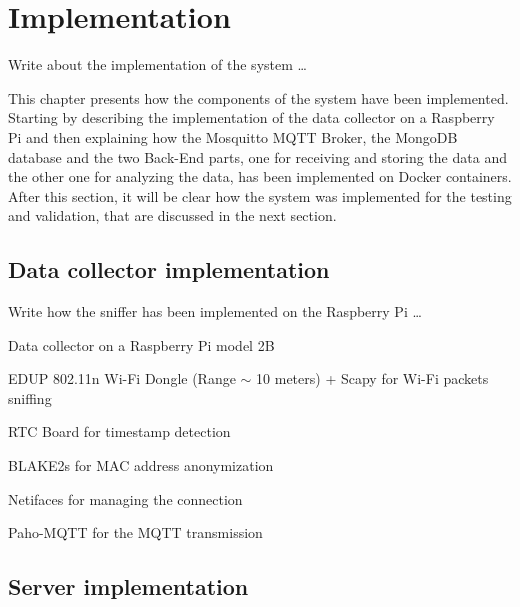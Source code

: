 \chapter{Implementation}
\label{cha:implementation}
\vspace{0.4 cm} 

Write about the implementation of the system \dots

This chapter presents how the components of the system have been implemented.
Starting by describing the implementation of the data collector on a Raspberry Pi and then explaining how the Mosquitto MQTT Broker, the MongoDB database and the two Back-End parts, one for receiving and storing the data and the other one for analyzing the data, has been implemented on Docker containers. After this section, it will be clear how the system was implemented for the testing and validation, that are discussed in the next section.


\section{Data collector implementation}
\label{sec:collector}
\vspace{0.2 cm} 

Write how the sniffer has been implemented on the Raspberry Pi \dots

Data collector on a Raspberry Pi model 2B

EDUP 802.11n Wi-Fi Dongle (Range $\sim$ 10 meters) + Scapy for Wi-Fi packets sniffing

RTC Board for timestamp detection

BLAKE2s for MAC address anonymization

Netifaces for managing the connection

Paho-MQTT for the MQTT transmission





\section{Server implementation}
\label{sec:server}
\vspace{0.2 cm} 

